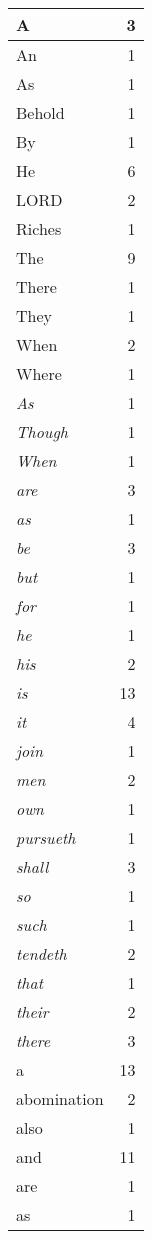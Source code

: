\begin{center}
\begin{longtable}{l|r}
A & 3\\ \hline 
An & 1\\ \hline 
As & 1\\ \hline 
Behold & 1\\ \hline 
By & 1\\ \hline 
He & 6\\ \hline 
LORD & 2\\ \hline 
Riches & 1\\ \hline 
The & 9\\ \hline 
There & 1\\ \hline 
They & 1\\ \hline 
When & 2\\ \hline 
Where & 1\\ \hline 
\emph{As} & 1\\ \hline 
\emph{Though} & 1\\ \hline 
\emph{When} & 1\\ \hline 
\emph{are} & 3\\ \hline 
\emph{as} & 1\\ \hline 
\emph{be} & 3\\ \hline 
\emph{but} & 1\\ \hline 
\emph{for} & 1\\ \hline 
\emph{he} & 1\\ \hline 
\emph{his} & 2\\ \hline 
\emph{is} & 13\\ \hline 
\emph{it} & 4\\ \hline 
\emph{join} & 1\\ \hline 
\emph{men} & 2\\ \hline 
\emph{own} & 1\\ \hline 
\emph{pursueth} & 1\\ \hline 
\emph{shall} & 3\\ \hline 
\emph{so} & 1\\ \hline 
\emph{such} & 1\\ \hline 
\emph{tendeth} & 2\\ \hline 
\emph{that} & 1\\ \hline 
\emph{their} & 2\\ \hline 
\emph{there} & 3\\ \hline 
a & 13\\ \hline 
abomination & 2\\ \hline 
also & 1\\ \hline 
and & 11\\ \hline 
are & 1\\ \hline 
as & 1\\ \hline 

\end{longtable}
\end{center}
